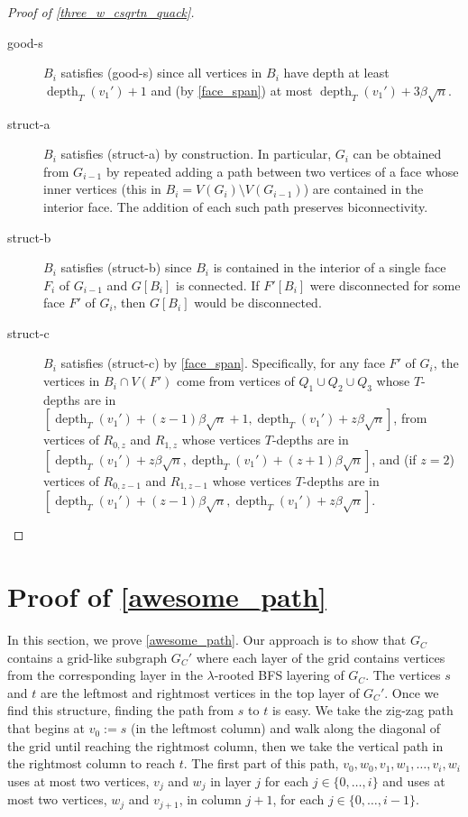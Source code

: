 \documentclass{patmorin}
\DeclareMathOperator{\depth}{depth}
\begin{document}
\begin{proof}[Proof of \cref{three_w_csqrtn_quack}]
\begin{description}
    \item[good-s] $B_i$ satisfies (good-s) since all vertices in $B_i$ have depth at least $\depth_T(v_1')+1$ and (by \cref{face_span}) at most $\depth_T(v_1')+3\beta\sqrt{n}$.

    \item[struct-a] $B_i$ satisfies (struct-a) by construction.  In particular, $G_i$ can be obtained from $G_{i-1}$ by repeated adding a path between two vertices of a face whose inner vertices (this in $B_i=V(G_i)\setminus V(G_{i-1})$) are contained in the interior face.  The addition of each such path preserves biconnectivity.

    \item[struct-b] $B_i$ satisfies (struct-b) since $B_i$ is contained in the interior of a single face $F_i$ of $G_{i-1}$ and $G[B_i]$ is connected.  If $F'[B_i]$ were disconnected for some face $F'$ of $G_i$, then $G[B_i]$ would be disconnected.

    \item[struct-c] $B_i$ satisfies (struct-c) by \cref{face_span}.  Specifically, for any face $F'$ of $G_i$, the vertices in $B_i\cap V(F')$ come from vertices of $Q_1\cup Q_2\cup Q_3$ whose $T$-depths are in $[\depth_T(v_1')+(z-1)\beta\sqrt{n}+1,\depth_T(v_1')+z\beta\sqrt{n}]$, from vertices of $R_{0,z}$ and $R_{1,z}$ whose vertices $T$-depths are in $[\depth_T(v_1')+z\beta\sqrt{n},\depth_T(v_1')+(z+1)\beta\sqrt{n}]$, and (if $z=2$) vertices of $R_{0,z-1}$ and $R_{1,z-1}$ whose vertices $T$-depths are in $[\depth_T(v_1')+(z-1)\beta\sqrt{n},\depth_T(v_1')+z\beta\sqrt{n}]$. \qedhere
  \end{description}
\end{proof}



\section{Proof of \cref{awesome_path}}
\label{crux_section}

In this section, we prove \cref{awesome_path}.  Our approach is to show that $G_C$ contains a grid-like subgraph $G_C'$ where each layer of the grid contains vertices from the corresponding layer in the $\lambda$-rooted BFS layering of $G_C$. The vertices $s$ and $t$ are the leftmost and rightmost vertices in the top layer of $G_C'$.  Once we find this structure, finding the path from $s$ to $t$ is easy.  We take the zig-zag path that begins at $v_0:=s$ (in the leftmost column) and walk along the diagonal of the grid until reaching the rightmost column, then we take the vertical path in the rightmost column to reach $t$. The first part of this path, $v_0,w_0,v_1,w_1,\ldots,v_i,w_i$ uses at most two vertices, $v_j$ and $w_j$ in layer $j$ for each $j\in\{0,\ldots,i\}$ and uses at most two vertices, $w_j$ and $v_{j+1}$, in column $j+1$, for each $j\in\{0,\ldots,i-1\}$.
\end{document}

